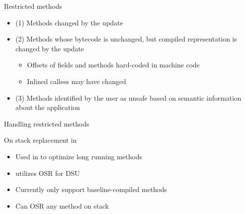 {
\begin{frame}[t,fragile]{Restricted methods}%
\begin{itemize}
\item (1) Methods changed by the update
\item (2) Methods whose bytecode is unchanged, but compiled representation is
      changed by the update
  \begin{itemize}
  \item Offsets of fields and methods hard-coded in machine code
  \item Inlined callees may have changed
  \end{itemize}
\item (3) Methods identified by the user as unsafe based on semantic
information about the application
\end{itemize}
\end{frame}
}

\begin{frame}[c,fragile]{Handling restricted methods}%
\hspace*{-5mm}
\end{frame}

\begin{frame}[t,fragile]{On stack replacement in \DSU{}}%
\begin{itemize}
\item Used in \JikesRVM{} to optimize long running methods
\item \DSU{} utilizes OSR for DSU
\item Currently only support baseline-compiled methods
\item Can OSR any method on stack
\end{itemize}
\end{frame}

